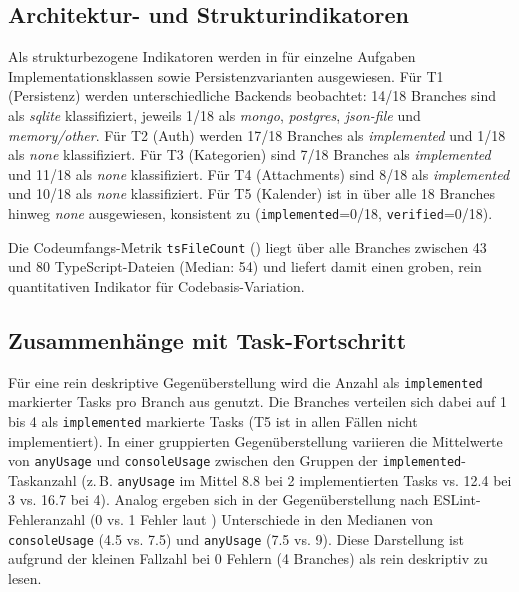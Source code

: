 \subsection{Architektur- und Strukturindikatoren}
\label{sec:results_quality_architecture}

Als strukturbezogene Indikatoren werden in  für einzelne Aufgaben Implementationsklassen sowie Persistenzvarianten ausgewiesen.
Für T1 (Persistenz) werden unterschiedliche Backends beobachtet: 14/18 Branches sind als \emph{sqlite} klassifiziert, jeweils 1/18 als \emph{mongo}, \emph{postgres}, \emph{json-file} und \emph{memory/other}.
Für T2 (Auth) werden 17/18 Branches als \emph{implemented} und 1/18 als \emph{none} klassifiziert.
Für T3 (Kategorien) sind 7/18 Branches als \emph{implemented} und 11/18 als \emph{none} klassifiziert. Für T4 (Attachments) sind 8/18 als \emph{implemented} und 10/18 als \emph{none} klassifiziert.
Für T5 (Kalender) ist in  über alle 18 Branches hinweg \emph{none} ausgewiesen, konsistent zu  (\texttt{implemented}=0/18, \texttt{verified}=0/18).

Die Codeumfangs-Metrik \texttt{tsFileCount} () liegt über alle Branches zwischen 43 und 80 TypeScript-Dateien (Median: 54) und liefert damit einen groben, rein quantitativen Indikator für Codebasis-Variation.

\subsection{Zusammenhänge mit Task-Fortschritt}
\label{sec:results_quality_correlations}

Für eine rein deskriptive Gegenüberstellung wird die Anzahl als \texttt{implemented} markierter Tasks pro Branch aus  genutzt.
Die Branches verteilen sich dabei auf 1 bis 4 als \texttt{implemented} markierte Tasks (T5 ist in allen Fällen nicht implementiert).
In einer gruppierten Gegenüberstellung variieren die Mittelwerte von \texttt{anyUsage} und \texttt{consoleUsage} zwischen den Gruppen der \texttt{implemented}-Taskanzahl (z.\,B. \texttt{anyUsage} im Mittel 8.8 bei 2 implementierten Tasks vs. 12.4 bei 3 vs. 16.7 bei 4).
Analog ergeben sich in der Gegenüberstellung nach ESLint-Fehleranzahl (0 vs. 1 Fehler laut ) Unterschiede in den Medianen von \texttt{consoleUsage} (4.5 vs. 7.5) und \texttt{anyUsage} (7.5 vs. 9). Diese Darstellung ist aufgrund der kleinen Fallzahl bei 0 Fehlern (4 Branches) als rein deskriptiv zu lesen.

